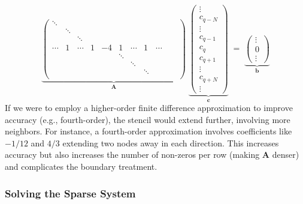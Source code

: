 \begin{equation}
\underbrace{
\left(
\begin{array}{ccccccccccc}
\ddots &        &        &        &        &        &        &        &        &        & \\
      & \ddots  &        &        &        &        &        &        &        &        & \\
      &        & \ddots  &        &        &        &        &        &        &        & \\
\cdots& 1      & \cdots & 1      & -4     & 1      & \cdots & 1      & \cdots &        & \\
      &        &        &        &        & \ddots &        &        &        &        & \\
      &        &        &        &        &        & \ddots &        &        &        & \\
      &        &        &        &        &        &        & \ddots &        &        & \\
\end{array}
\right)
}_{\mathbf{A}}
\;
\underbrace{
\left(
\begin{array}{c}
\vdots\\
c_{q-N}\\
\vdots\\
c_{q-1}\\
c_{q}\\
c_{q+1}\\
\vdots\\
c_{q+N}\\
\vdots
\end{array}
\right)
}_{\mathbf{c}}
\;=\;
\underbrace{
\left(
\begin{array}{c}
\vdots\\
0\\
\vdots
\end{array}
\right)
}_{\mathbf{b}}
\end{equation}
If we were to employ a higher-order finite difference approximation to improve accuracy (e.g., fourth-order), the stencil would extend further, involving more neighbors. For instance, a fourth-order approximation involves coefficients like $-1/12$ and $4/3$ extending two nodes away in each direction. This increases accuracy but also increases the number of non-zeros per row (making $\mathbf{A}$ denser) and complicates the boundary treatment.

\subsubsection{Solving the Sparse System}

